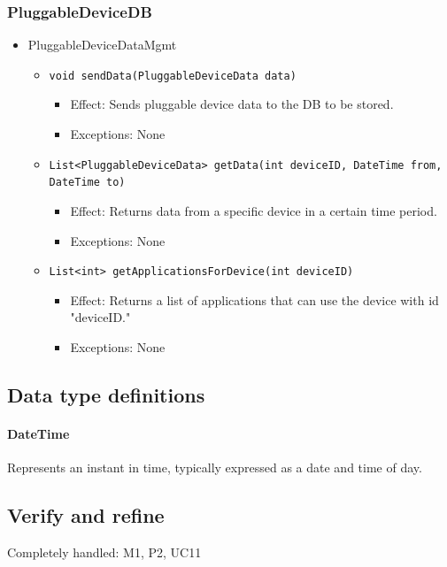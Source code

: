     \subsubsection{PluggableDeviceDB}
        \begin{itemize}
            \item PluggableDeviceDataMgmt
            \begin{itemize}
                \item \texttt{void sendData(PluggableDeviceData data)}
                \begin{itemize}
                    \item Effect: Sends pluggable device data to the DB to be stored.
                    \item Exceptions: None
                \end{itemize}
                \item \texttt{List<PluggableDeviceData> getData(int deviceID, DateTime from, DateTime to)}
                \begin{itemize}
                    \item Effect: Returns data from a specific device in a certain time period.
                    \item Exceptions: None
                \end{itemize}
                \item \texttt{List<int> getApplicationsForDevice(int deviceID)}
                \begin{itemize}
                    \item Effect: Returns a list of applications that can use the device with id "deviceID."
                    \item Exceptions: None
                \end{itemize}
            \end{itemize}
        \end{itemize}


\subsection{Data type definitions}
    \paragraph{DateTime} Represents an instant in time, typically expressed as a date and time of day.


\subsection{Verify and refine}
    Completely handled: M1, P2, UC11 \\

